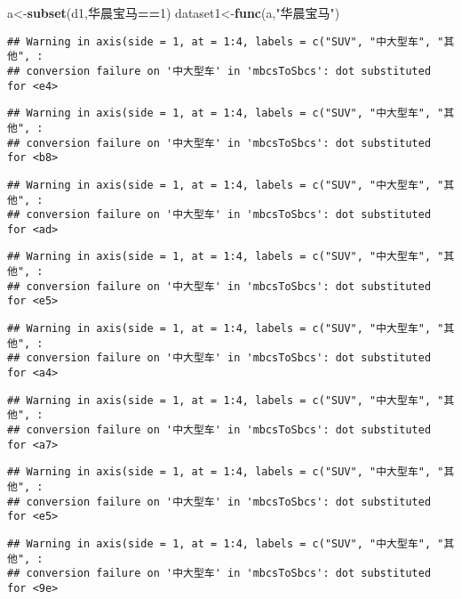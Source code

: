 \documentclass[]{article}
\newenvironment{Shaded}{\begin{snugshade}}{\end{snugshade}}
\newcommand{\KeywordTok}[1]{\textcolor[rgb]{0.13,0.29,0.53}{\textbf{#1}}}
\newcommand{\DecValTok}[1]{\textcolor[rgb]{0.00,0.00,0.81}{#1}}
\newcommand{\StringTok}[1]{\textcolor[rgb]{0.31,0.60,0.02}{#1}}
\newcommand{\OperatorTok}[1]{\textcolor[rgb]{0.81,0.36,0.00}{\textbf{#1}}}
\newcommand{\NormalTok}[1]{#1}
\begin{document}
\begin{Shaded}
\begin{Highlighting}[]
\NormalTok{a<-}\KeywordTok{subset}\NormalTok{(d1,华晨宝马}\OperatorTok{==}\DecValTok{1}\NormalTok{)}
\NormalTok{dataset1<-}\KeywordTok{func}\NormalTok{(a,}\StringTok{"华晨宝马"}\NormalTok{)}
\end{Highlighting}
\end{Shaded}

\begin{verbatim}
## Warning in axis(side = 1, at = 1:4, labels = c("SUV", "中大型车", "其他", :
## conversion failure on '中大型车' in 'mbcsToSbcs': dot substituted for <e4>
\end{verbatim}

\begin{verbatim}
## Warning in axis(side = 1, at = 1:4, labels = c("SUV", "中大型车", "其他", :
## conversion failure on '中大型车' in 'mbcsToSbcs': dot substituted for <b8>
\end{verbatim}

\begin{verbatim}
## Warning in axis(side = 1, at = 1:4, labels = c("SUV", "中大型车", "其他", :
## conversion failure on '中大型车' in 'mbcsToSbcs': dot substituted for <ad>
\end{verbatim}

\begin{verbatim}
## Warning in axis(side = 1, at = 1:4, labels = c("SUV", "中大型车", "其他", :
## conversion failure on '中大型车' in 'mbcsToSbcs': dot substituted for <e5>
\end{verbatim}

\begin{verbatim}
## Warning in axis(side = 1, at = 1:4, labels = c("SUV", "中大型车", "其他", :
## conversion failure on '中大型车' in 'mbcsToSbcs': dot substituted for <a4>
\end{verbatim}

\begin{verbatim}
## Warning in axis(side = 1, at = 1:4, labels = c("SUV", "中大型车", "其他", :
## conversion failure on '中大型车' in 'mbcsToSbcs': dot substituted for <a7>
\end{verbatim}

\begin{verbatim}
## Warning in axis(side = 1, at = 1:4, labels = c("SUV", "中大型车", "其他", :
## conversion failure on '中大型车' in 'mbcsToSbcs': dot substituted for <e5>
\end{verbatim}

\begin{verbatim}
## Warning in axis(side = 1, at = 1:4, labels = c("SUV", "中大型车", "其他", :
## conversion failure on '中大型车' in 'mbcsToSbcs': dot substituted for <9e>
\end{verbatim}
\end{document}
